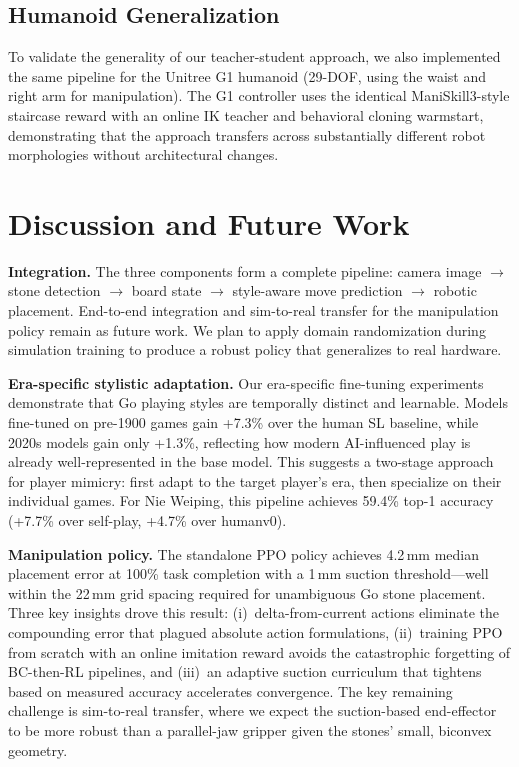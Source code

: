 \documentclass{article}
\begin{document}
\subsection{Humanoid Generalization}

To validate the generality of our teacher-student approach, we also implemented the same pipeline for the Unitree G1 humanoid (29-DOF, using the waist and right arm for manipulation). The G1 controller uses the identical ManiSkill3-style staircase reward with an online IK teacher and behavioral cloning warmstart, demonstrating that the approach transfers across substantially different robot morphologies without architectural changes.

\section{Discussion and Future Work}

\textbf{Integration.} The three components form a complete pipeline: camera image $\to$ stone detection $\to$ board state $\to$ style-aware move prediction $\to$ robotic placement. End-to-end integration and sim-to-real transfer for the manipulation policy remain as future work. We plan to apply domain randomization during simulation training to produce a robust policy that generalizes to real hardware.

\textbf{Era-specific stylistic adaptation.} Our era-specific fine-tuning experiments demonstrate that Go playing styles are temporally distinct and learnable. Models fine-tuned on pre-1900 games gain +7.3\% over the human SL baseline, while 2020s models gain only +1.3\%, reflecting how modern AI-influenced play is already well-represented in the base model. This suggests a two-stage approach for player mimicry: first adapt to the target player's era, then specialize on their individual games. For Nie Weiping, this pipeline achieves 59.4\% top-1 accuracy (+7.7\% over self-play, +4.7\% over humanv0).

\textbf{Manipulation policy.} The standalone PPO policy achieves 4.2\,mm median placement error at 100\% task completion with a 1\,mm suction threshold---well within the 22\,mm grid spacing required for unambiguous Go stone placement. Three key insights drove this result: (i)~delta-from-current actions eliminate the compounding error that plagued absolute action formulations, (ii)~training PPO from scratch with an online imitation reward avoids the catastrophic forgetting of BC-then-RL pipelines, and (iii)~an adaptive suction curriculum that tightens based on measured accuracy accelerates convergence. The key remaining challenge is sim-to-real transfer, where we expect the suction-based end-effector to be more robust than a parallel-jaw gripper given the stones' small, biconvex geometry.
\end{document}
